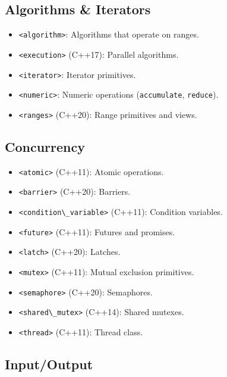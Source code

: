 \hypertarget{algorithms-iterators}{%
\subsection{Algorithms \& Iterators}\label{algorithms-iterators}}

\begin{itemize}
\tightlist
\item
  \passthrough{\lstinline!<algorithm>!}: Algorithms that operate on
  ranges.
\item
  \passthrough{\lstinline!<execution>!} (C++17): Parallel algorithms.
\item
  \passthrough{\lstinline!<iterator>!}: Iterator primitives.
\item
  \passthrough{\lstinline!<numeric>!}: Numeric operations
  (\passthrough{\lstinline!accumulate!},
  \passthrough{\lstinline!reduce!}).
\item
  \passthrough{\lstinline!<ranges>!} (C++20): Range primitives and
  views.
\end{itemize}

\hypertarget{concurrency}{%
\subsection{Concurrency}\label{concurrency}}

\begin{itemize}
\tightlist
\item
  \passthrough{\lstinline!<atomic>!} (C++11): Atomic operations.
\item
  \passthrough{\lstinline!<barrier>!} (C++20): Barriers.
\item
  \passthrough{\lstinline!<condition\_variable>!} (C++11): Condition
  variables.
\item
  \passthrough{\lstinline!<future>!} (C++11): Futures and promises.
\item
  \passthrough{\lstinline!<latch>!} (C++20): Latches.
\item
  \passthrough{\lstinline!<mutex>!} (C++11): Mutual exclusion
  primitives.
\item
  \passthrough{\lstinline!<semaphore>!} (C++20): Semaphores.
\item
  \passthrough{\lstinline!<shared\_mutex>!} (C++14): Shared mutexes.
\item
  \passthrough{\lstinline!<thread>!} (C++11): Thread class.
\end{itemize}

\hypertarget{inputoutput}{%
\subsection{Input/Output}\label{inputoutput}}

